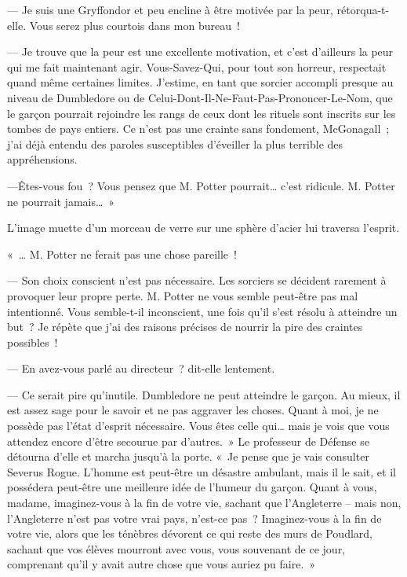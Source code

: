 --- Je suis une Gryffondor et peu encline à être motivée par la peur, rétorqua-t-elle. Vous serez plus courtois dans mon bureau~!

--- Je trouve que la peur est une excellente motivation, et c'est d'ailleurs la peur qui me fait maintenant agir. Vous-Savez-Qui, pour tout son horreur, respectait quand même certaines limites. J'estime, en tant que sorcier accompli presque au niveau de Dumbledore ou de Celui-Dont-Il-Ne-Faut-Pas-Prononcer-Le-Nom, que le garçon pourrait rejoindre les rangs de ceux dont les rituels sont inscrits sur les tombes de pays entiers. Ce n'est pas une crainte sans fondement, McGonagall~; j'ai déjà entendu des paroles susceptibles d'éveiller la plus terrible des appréhensions.

---Êtes-vous fou~? Vous pensez que M. Potter pourrait… c'est ridicule. M. Potter ne pourrait jamais…~»

L'image muette d'un morceau de verre sur une sphère d'acier lui traversa l'esprit.

«~… M. Potter ne ferait pas une chose pareille~!

--- Son choix conscient n'est pas nécessaire. Les sorciers se décident rarement à provoquer leur propre perte. M. Potter ne vous semble peut-être pas mal intentionné. Vous semble-t-il inconscient, une fois qu'il s'est résolu à atteindre un but~? Je répète que j'ai des raisons précises de nourrir la pire des craintes possibles~!

--- En avez-vous parlé au directeur~? dit-elle lentement.

--- Ce serait pire qu'inutile. Dumbledore ne peut atteindre le garçon. Au mieux, il est assez sage pour le savoir et ne pas aggraver les choses. Quant à moi, je ne possède pas l'état d'esprit nécessaire. Vous êtes celle qui… mais je vois que vous attendez encore d'être secourue par d'autres.~» Le professeur de Défense se détourna d'elle et marcha jusqu'à la porte. «~Je pense que je vais consulter Severus Rogue. L'homme est peut-être un désastre ambulant, mais il le sait, et il possédera peut-être une meilleure idée de l'humeur du garçon. Quant à vous, madame, imaginez-vous à la fin de votre vie, sachant que l'Angleterre -- mais non, l'Angleterre n'est pas votre vrai pays, n'est-ce pas~? Imaginez-vous à la fin de votre vie, alors que les ténèbres dévorent ce qui reste des murs de Poudlard, sachant que vos élèves mourront avec vous, vous souvenant de ce jour, comprenant qu'il y avait autre chose que vous auriez pu faire.~»
